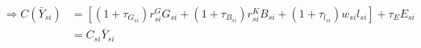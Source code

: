 \begin{equation*}
    \begin{split}
        \Rightarrow C(\bar{Y}_{si}) &  = \left[
            (1+ \tau_{G_{si}}) r^{G}_{si}G_{si} + (1+ \tau_{B_{si}}) r^{K}_{si}B_{si} + (1+ \tau_{l_{si}}) w_{si}l_{si}
        \right] + {\tau_{E} E_{si}} \\
        & = C_{si} \bar{Y}_{si}  \\
    \end{split}
\end{equation*}